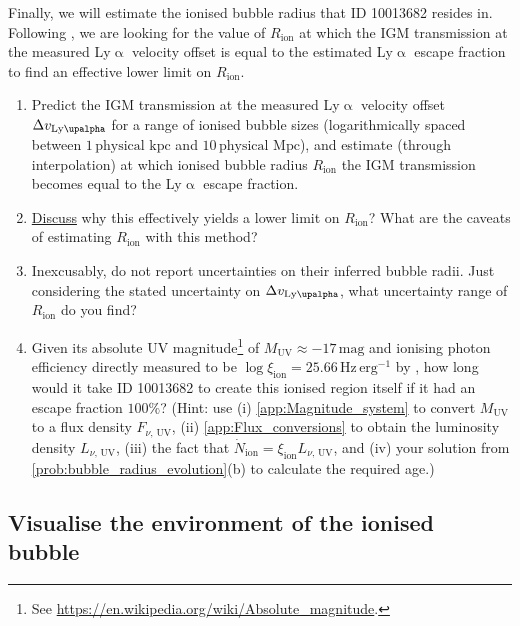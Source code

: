 \documentclass{article}
\newcommand{\Lya}{{Ly\ensuremath{\upalpha}}\xspace}
\theoremstyle{definition}
\begin{document}
Finally, we will estimate the ionised bubble radius that ID 10013682 resides in. Following \citet{2024A&A...682A..40W}, we are looking for the value of $R_\text{ion}$ at which the IGM transmission at the measured \Lya velocity offset is equal to the estimated \Lya escape fraction to find an effective lower limit on $R_\text{ion}$.
\begin{enumerate}[label=(\alph*)]
    \item Predict the IGM transmission at the measured \Lya velocity offset $\Delta v_\text{\Lya}$ for a range of ionised bubble sizes (logarithmically spaced between $1 \, \text{physical kpc}$ and $10 \, \text{physical Mpc}$), and estimate (through interpolation) at which ionised bubble radius $R_\text{ion}$ the IGM transmission becomes equal to the \Lya escape fraction.
    \item \underline{Discuss} why this effectively yields a lower limit on $R_\text{ion}$? What are the caveats of estimating $R_\text{ion}$ with this method?
    \item Inexcusably, \citet{2024A&A...682A..40W} do not report uncertainties on their inferred bubble radii. Just considering the stated uncertainty on $\Delta v_\text{\Lya}$, what uncertainty range of $R_\text{ion}$ do you find?
    \item Given its absolute UV magnitude\footnote{See \url{https://en.wikipedia.org/wiki/Absolute_magnitude}.} of $M_\text{UV} \approx -17 \, \mathrm{mag}$ and ionising photon efficiency directly measured to be $\log \xi_\text{ion} = 25.66 \, \mathrm{Hz \, erg^{-1}}$ by \citet{2024A&A...684A..84S}, how long would it take ID 10013682 to create this ionised region itself if it had an escape fraction $100\%$? (Hint: use (i) \cref{app:Magnitude_system} to convert $M_\text{UV}$ to a flux density $F_{\nu, \, \text{UV}}$, (ii) \cref{app:Flux_conversions} to obtain the luminosity density $L_{\nu, \, \text{UV}}$, (iii) the fact that $\dot{N}_\text{ion} = \xi_\text{ion} L_{\nu, \, \text{UV}}$, and (iv) your solution from \cref{prob:bubble_radius_evolution}(b) to calculate the required age.)
\end{enumerate}

\subsection{Visualise the environment of the ionised bubble}
\end{document}
